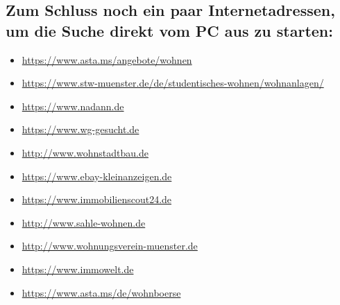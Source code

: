 \begin{multicols*}{2}
\subsection*{Zum Schluss noch ein paar Internetadressen, um die Suche direkt vom PC aus zu starten:}
\vspace{-1ex}
\begin{itemize}[leftmargin=0.8cm]
	\raggedright
	\item \url{https://www.asta.ms/angebote/wohnen}
        \item \url{https://www.stw-muenster.de/de/studentisches-wohnen/wohnanlagen/}
	\item \url{https://www.nadann.de}
	\item \url{https://www.wg-gesucht.de}
	\item \url{http://www.wohnstadtbau.de}
	\item \url{https://www.ebay-kleinanzeigen.de}
	\item \url{https://www.immobilienscout24.de}
	\item \url{http://www.sahle-wohnen.de}
	\item \url{http://www.wohnungsverein-muenster.de}
	\item \url{https://www.immowelt.de}
	\item \url{https://www.asta.ms/de/wohnboerse}
\end{itemize}





\end{multicols*}
